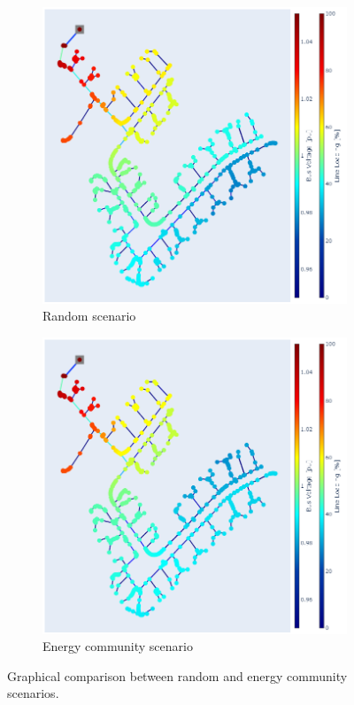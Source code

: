 \documentclass[a4paper,10pt]{report}
\begin{document}
\FloatBarrier
\begin{figure}[htpb]
	\centering
	\begin{subfigure}[b]{0.475\textwidth}
		\centering
		\includegraphics[width=\textwidth]{random_loads_min_full}
		\caption[]
		{{\small Random scenario}}    
		\label{random_vs_en_comm_a}
	\end{subfigure}
	\hfill
	\begin{subfigure}[b]{0.475\textwidth}  
		\centering 
		\includegraphics[width=\textwidth]{en_comm_min_full}
		\caption[]
		{{\small Energy community scenario}}    
		\label{random_vs_en_comm_b}
	\end{subfigure}
	\caption[Comparison of hosting capacities for time extremes]
	{\small Graphical comparison between random and energy community scenarios.} 
	\label{random_vs_en_comm}
\end{figure}
\FloatBarrier
\end{document}
